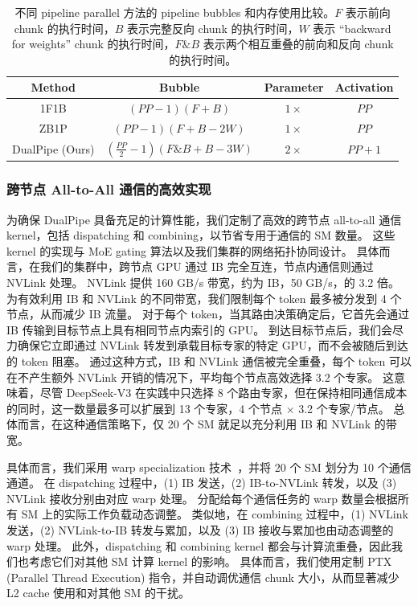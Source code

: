 \documentclass[11pt, a4paper, logo, copyright, nonumbering]{deepseek}
\newcommand{\dsviii}{DeepSeek-V3}
\begin{document}
\begin{table}[t]
    \centering
    \setlength{\tabcolsep}{15pt}
    \begin{tabular}{c c c c}
        \toprule
        \textbf{Method} & \textbf{Bubble} & \textbf{Parameter} & \textbf{Activation} \\
        \midrule
        1F1B     & $(PP - 1)(F + B)$       & $1\times$ & $PP$ \\
        ZB1P     & $(PP - 1)(F + B - 2W)$   & $1\times$ & $PP$ \\
        DualPipe (Ours) & $(\frac{PP}{2} - 1)(F\&B + B - 3W)$ & $2\times$ & $PP + 1$ \\
        \bottomrule
    \end{tabular}
    \caption{
        不同 pipeline parallel 方法的 pipeline bubbles 和内存使用比较。$F$ 表示前向 chunk 的执行时间，$B$ 表示完整反向 chunk 的执行时间，$W$ 表示 ``backward for weights'' chunk 的执行时间，$F\&B$ 表示两个相互重叠的前向和反向 chunk 的执行时间。
    }
    \label{tab:dualpipe-bubble}
\end{table}

\subsubsection{跨节点 All-to-All 通信的高效实现}

为确保 DualPipe 具备充足的计算性能，我们定制了高效的跨节点 all-to-all 通信 kernel，包括 dispatching 和 combining，以节省专用于通信的 SM 数量。
这些 kernel 的实现与 MoE gating 算法以及我们集群的网络拓扑协同设计。
具体而言，在我们的集群中，跨节点 GPU 通过 IB 完全互连，节点内通信则通过 NVLink 处理。
NVLink 提供 160 GB/s 带宽，约为 IB，50 GB/s，的 3.2 倍。
为有效利用 IB 和 NVLink 的不同带宽，我们限制每个 token 最多被分发到 4 个节点，从而减少 IB 流量。
对于每个 token，当其路由决策确定后，它首先会通过 IB 传输到目标节点上具有相同节点内索引的 GPU。
到达目标节点后，我们会尽力确保它立即通过 NVLink 转发到承载目标专家的特定 GPU，而不会被随后到达的 token 阻塞。
通过这种方式，IB 和 NVLink 通信被完全重叠，每个 token 可以在不产生额外 NVLink 开销的情况下，平均每个节点高效选择 3.2 个专家。
这意味着，尽管 \dsviii{} 在实践中只选择 8 个路由专家，但在保持相同通信成本的同时，这一数量最多可以扩展到 13 个专家，4 个节点 $\times$ 3.2 个专家/节点。
总体而言，在这种通信策略下，仅 20 个 SM 就足以充分利用 IB 和 NVLink 的带宽。

具体而言，我们采用 warp specialization 技术~\citep{warp-spec}，并将 20 个 SM 划分为 10 个通信通道。
在 dispatching 过程中，(1) IB 发送，(2) IB-to-NVLink 转发，以及 (3) NVLink 接收分别由对应 warp 处理。
分配给每个通信任务的 warp 数量会根据所有 SM 上的实际工作负载动态调整。
类似地，在 combining 过程中，(1) NVLink 发送，(2) NVLink-to-IB 转发与累加，以及 (3) IB 接收与累加也由动态调整的 warp 处理。
此外，dispatching 和 combining kernel 都会与计算流重叠，因此我们也考虑它们对其他 SM 计算 kernel 的影响。
具体而言，我们使用定制 PTX (Parallel Thread Execution) 指令，并自动调优通信 chunk 大小，从而显著减少 L2 cache 使用和对其他 SM 的干扰。
\end{document}
